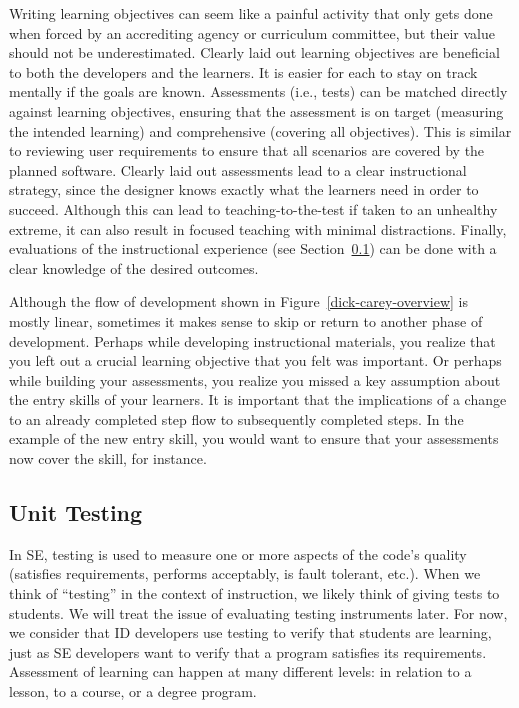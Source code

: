 Writing learning objectives can seem like a painful activity that only gets done when forced by an accrediting agency or curriculum committee, but their value should not be underestimated.
Clearly laid out learning objectives are beneficial to both the developers and the learners.
It is easier for each to stay on track mentally if the goals are known.
Assessments (i.e., tests) can be matched directly against learning objectives, ensuring that the assessment is on target (measuring the intended learning) and comprehensive (covering all objectives).
This is similar to reviewing user requirements to ensure that all scenarios are covered by the planned software.
Clearly laid out assessments lead to a clear instructional strategy, since the designer knows exactly what the learners need in order to succeed.
Although this can lead to teaching-to-the-test if taken to an unhealthy extreme, it can also result in focused teaching with minimal distractions.
Finally, evaluations of the instructional experience (see Section~\ref{UnitTest}) can be done with a clear knowledge of the desired outcomes.

Although the flow of development shown in Figure~\ref{dick-carey-overview} is mostly linear, sometimes it makes sense to skip or return to another phase of development.
Perhaps while developing instructional materials, you realize that you left out a crucial learning objective that you felt was important.
Or perhaps while building your assessments, you realize you missed a key assumption about the entry skills of your learners.
It is important that the implications of a change to an already completed step flow to subsequently completed steps.
In the example of the new entry skill, you would want to ensure that your assessments now cover the skill, for instance.


\subsection{Unit Testing}
\label{UnitTest}

In SE, testing is used to measure one or more aspects of the code's quality (satisfies requirements, performs acceptably, is fault tolerant, etc.).
When we think of ``testing'' in the context of instruction, we likely think of giving tests to students.
We will treat the issue of evaluating testing instruments later.
For now, we consider that ID developers use testing to verify that students are learning, just as SE developers want to verify that a program satisfies its requirements.
Assessment of learning can happen at many different levels: in relation to a lesson, to a course, or a degree program.

